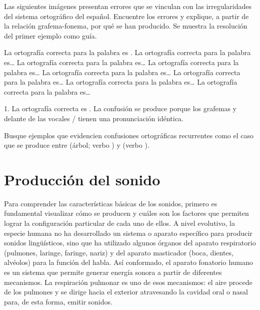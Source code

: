 \begin{ejercicio}\label{ej:03-ortografia}
\begin{consignas}
  \item Las siguientes imágenes presentan errores que se vinculan con las
        irregularidades del sistema ortográfico del español. Encuentre los
        errores y explique, a partir de la relación grafema-fonema, por qué se
        han producido. Se muestra la resolución del primer ejemplo como guía.


        \begin{exe}
          \ex La ortografía correcta para la palabra  es
              .
          \ex La ortografía correcta para la palabra  es\ldots
          \ex La ortografía correcta para la palabra  es\ldots
          \ex La ortografía correcta para la palabra  es\ldots
          \ex La ortografía correcta para la palabra  es\ldots
          \ex La ortografía correcta para la palabra  es\ldots
          \ex La ortografía correcta para la palabra  es\ldots
          \ex La ortografía correcta para la palabra  es\ldots
        \end{exe}
        \begin{resuelto}
        1. La ortografía correcta es . La confusión se produce
        porque los grafemas  y  delante de las vocales
        / tienen una pronunciación idéntica.
        \end{resuelto}
  \item Busque ejemplos que evidencien confusiones ortográficas recurrentes
        como el caso que se produce entre  (árbol; verbo
        ) y  (verbo ).
\end{consignas}
\end{ejercicio}

\section{Producción del sonido}

Para comprender las características básicas de los sonidos, primero es
fundamental visualizar cómo se producen y cuáles son los factores que permiten
lograr la configuración particular de cada uno de ellos. A nivel evolutivo, la
especie humana no ha desarrollado un sistema o aparato específico para producir
sonidos lingüísticos, sino que ha utilizado algunos órganos del aparato
respiratorio (pulmones, laringe, faringe, nariz) y del aparato masticador (boca,
dientes, alvéolos) para la función del habla. Así conformado, el aparato
fonatorio humano es un sistema que permite generar energía sonora a partir de
diferentes mecanismos. La respiración pulmonar es uno de esos mecanismos: el
aire procede de los pulmones y se dirige hacia el exterior atravesando la
cavidad oral o nasal para, de esta forma, emitir sonidos.

